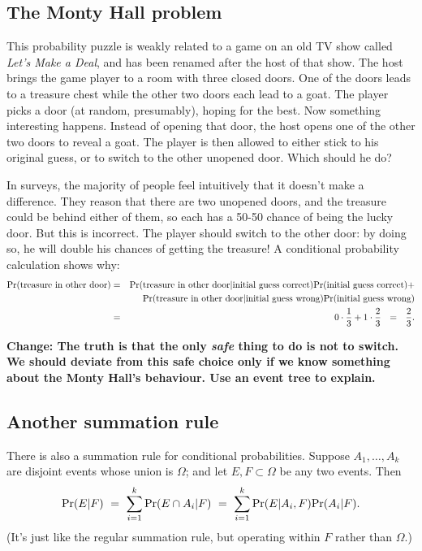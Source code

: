 \subsection{The Monty Hall problem}

This probability puzzle is weakly related to a game on an old TV show
called {\it Let's Make a Deal}, and has been renamed after the host of
that show. The host brings the game player to a room with three closed
doors. One of the doors leads to a treasure chest while the other two
doors each lead to a goat. The player picks a door (at random,
presumably), hoping for the best. Now something interesting
happens. Instead of opening that door, the host opens one of the other
two doors to reveal a goat. The player is then allowed to either stick
to his original guess, or to switch to the other unopened door. Which
should he do?

In surveys, the majority of people feel intuitively that it doesn't
make a difference. They reason that there are two unopened doors, and
the treasure could be behind either of them, so each has a 50-50
chance of being the lucky door. But this is incorrect. The player
should switch to the other door: by doing so, he will double his
chances of getting the treasure! A conditional probability calculation
shows why:
\begin{eqnarray*}
\pr(\mbox{treasure in other door}) 
& = & 
\pr(\mbox{treasure in other door} | \mbox{initial guess correct}) \pr(\mbox{initial guess correct}) + \\
& & \pr(\mbox{treasure in other door} | \mbox{initial guess wrong}) \pr(\mbox{initial guess wrong}) \\
& = & 
0 \cdot \frac{1}{3} + 1 \cdot \frac{2}{3} 
\ \ = \ \ 
\frac{2}{3} .
\end{eqnarray*}

{\bf Change: The truth is that the only {\em safe} thing to do is not
  to switch. We should deviate from this safe choice only if we know
  something about the Monty Hall's behaviour. Use an event tree to
  explain.}


\subsection{Another summation rule}

There is also a summation rule for conditional probabilities. Suppose $A_1, \ldots, A_k$ are disjoint events whose union is $\Omega$; and let $E,F \subset \Omega$ be any two events. Then
$$ \pr(E | F) 
\ = \ 
\sum_{i=1}^k \pr(E \cap A_i | F) 
\ = \ 
\sum_{i=1}^k \pr(E | A_i, F) \pr(A_i|F).
$$
(It's just like the regular summation rule, but operating within $F$ rather than $\Omega$.)

